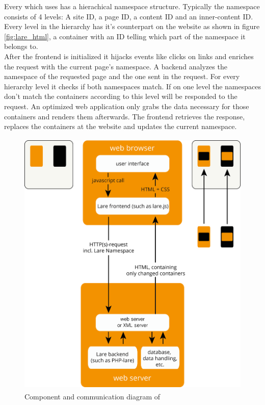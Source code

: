 Every \singlePageApplication{} which uses \lare{} has a hierachical namespace structure.
Typically the namespace consists of 4 levels: A site ID, a page ID, a content ID and an inner-content ID.
Every level in the hierarchy has it's counterpart on the website as shown in figure \ref{fig:lare_html}, a container with an ID telling which part of the namespace it belongs to.
\\
After the \lare{} frontend is initialized it hijacks events like clicks on links and enriches the request with the current page's namespace.
A \lare{} backend analyzes the namespace of the requested page and the one sent in the request.
For every hierarchy level it checks if both namespaces match.
If on one level the namespaces don't match the containers according to this level will be responded to the request.
An optimized web application only grabs the data necessary for those containers and renders them afterwards.
The \lare{} frontend retrieves the response, replaces the containers at the website and updates the current namespace.

\begin{figure}[H]
\centering
\includegraphics[height=13cm]{images/lare.png}
\caption[lare_components]{Component and communication diagram of \lare{}}
\label{fig:lare_components}
\end{figure}

